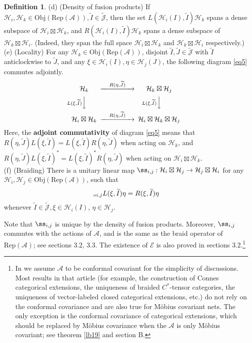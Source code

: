 \documentclass[12pt,a4paper]{article}
\theoremstyle{definition}
\newtheorem{df}{Definition}[section]
\theoremstyle{plain}
\newcommand{\mc}{\mathcal}
\newcommand{\wtd}{\widetilde}
\newcommand{\scr}{\mathscr}
\newcommand{\Jtd}{\widetilde{\mathcal J}}
\newcommand{\RepA}{\mathrm{Rep}(\mc A)}
\newcommand{\Obj}{\mathrm{Obj}}
\numberwithin{equation}{section}
\begin{document}
\begin{df}
	(d) (Density of fusion products) If $\mc H_i,\mc H_k\in\Obj(\RepA),\wtd I\in\Jtd$, then the set $L(\mc H_i(I),\wtd I)\mc H_k$ spans a dense subspace of $\mc H_i\boxtimes\mc H_k$, and $R(\mc H_i(I),\wtd I)\mc H_k$ spans a dense subspace of $\mc H_k\boxtimes\mc H_i$. (Indeed, they span the full space $\mc H_i\boxtimes\mc H_k$ and $\mc H_k\boxtimes\mc H_i$ respectively.)\\
	(e) (Locality) For any $\mc H_k\in\Obj(\RepA)$, disjoint $\wtd I,\wtd J\in\Jtd$ with $\wtd I$ anticlockwise to $\wtd J$, and any $\xi\in\mc H_i(I),\eta\in\mc H_j(J)$, the following diagram \eqref{eq5}  commutes adjointly.
	\begin{align}
	\begin{CD}
	\mc H_k @> \quad R(\eta,\wtd J)\quad   >> \mc H_k\boxtimes\mc H_j\\
	@V L(\xi,\wtd I)   V  V @V L(\xi,\wtd I) VV\\
	\mc H_i\boxtimes\mc H_k @> \quad R(\eta,\wtd J) \quad  >> \mc H_i\boxtimes\mc H_k\boxtimes\mc H_j
	\end{CD}\label{eq5}
	\end{align}
Here, the \textbf{adjoint commutativity} of diagram \eqref{eq5} means that $R(\eta,\wtd J)L(\xi,\wtd I)=L(\xi,\wtd I)R(\eta,\wtd J)$ when acting on $\mc H_k$, and $R(\eta,\wtd J)L(\xi,\wtd I)^*=L(\xi,\wtd I)^*R(\eta,\wtd J)$ when acting on $\mc H_i\boxtimes\mc H_k$.\\
	(f) (Braiding) There is a unitary linear map $\ss_{i,j}:\mc H_i\boxtimes\mc H_j\rightarrow\mc H_j\boxtimes \mc H_i$  for any $\mc H_i,\mc H_j\in\Obj(\RepA)$, such that  
	\begin{align}
	\ss_{i,j} L(\xi,\wtd I)\eta=R(\xi,\wtd I)\eta
	\end{align}
	whenever $\wtd I\in\Jtd,\xi\in\mc H_i(I)$, $\eta\in\mc H_j$.
\end{df}



Note that $\ss_{i,j}$ is unique by the density of fusion products. Moreover, $\ss_{i,j}$ commutes with the actions of $\mc A$, and  is the same as the braid operator of $\RepA$; see \cite{Gui21a} sections 3.2, 3.3. The existence of $\scr E$ is also proved in \cite{Gui21a} sections 3.2.\footnote{In \cite{Gui21a} we assume $\mc A$ to be conformal covariant  for the simplicity of discussions. Most results in that article (for example, the construction of Connes categorical extensions, the uniqueness of braided $C^*$-tensor categories, the uniqueness of vector-labeled closed categorical extensions, etc.) do not rely on the conformal covariance and are also true for M\"obius covariant nets. The only exception is the conformal covariance of categorical extensions, which should be replaced by M\"obius covariance when the $\mc A$ is only M\"obius covariant; see theorem \ref{lb19} and section B.}
\end{document}

